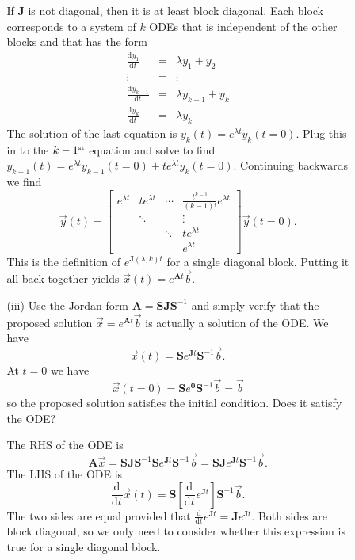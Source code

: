 \documentclass[11pt,fleqn]{article}
\newcommand{\mat}[1]{\mathbf{#1}}
\newcommand{\dd}[3]{\frac{\mathrm{d}^{#3}{#1}}{\mathrm{d}{#2}^{#3}}}
\begin{document}
\begin{enumerate}
\begin{itemize}
\begin{itemize}
     		If {\bf J} is not diagonal, then it is at least block diagonal. Each block corresponds to a system of $k$ ODEs that is independent of the other blocks and that has the form
     		\begin{eqnarray*}
     		\dd{y_1}{t}{} &=& \lambda y_1 + y_2 \\
     		\vdots &=& \vdots\\
     		\dd{y_{k-1}}{t}{} &=& \lambda y_{k-1} + y_k\\
     		\dd{y_k}{t}{} &=& \lambda y_k
     		\end{eqnarray*}
     		The solution of the last equation is $y_k(t) = e^{\lambda t}y_k(t=0)$. Plug this in to the $k-1^{\mbox{\tiny st}}$ equation and solve to find $y_{k-1}(t) = e^{\lambda t}y_{k-1}(t=0) + te^{\lambda t}y_{k}(t=0).$ Continuing backwards we find
     		\[\vec{y}(t) = \left[\begin{array}{cccc}e^{\lambda t}&te^{\lambda t}&\cdots&\frac{t^{k-1}}{(k-1)!}e^{\lambda t}\\&\ddots&&\vdots\\&&\ddots&te^{\lambda t}\\&&&e^{\lambda t}\end{array}\right]\vec{y}(t=0).\]
     		This is the definition of $e^{\mathbf{J}(\lambda,k)t}$ for a single diagonal block. Putting it all back together yields  $\vec{x}(t) = e^{\mathbf{A}t}\vec{b}$.
     		
     		\item[(iii)] Use the Jordan form $\mathbf{A} = \mathbf{SJS}^{-1}$ and simply verify that the proposed solution $\vec{x} = e^{\mathbf{A}t}\vec{b}$ is actually a solution of the ODE. We have
     		\[\vec{x}(t) = \mathbf{S}e^{\mathbf{J}t}\mathbf{S}^{-1}\vec{b}.\]
     		At $t=0$ we have 
     		\[\vec{x}(t=0) = \mathbf{S}e^{\mathbf{0}}\mathbf{S}^{-1}\vec{b} = \vec{b}\]
     		so the proposed solution satisfies the initial condition. Does it satisfy the ODE?
     		
     		The RHS of the ODE is
     		 \[\mathbf{A}\vec{x} = \mathbf{SJS}^{-1}\mathbf{S}e^{\mathbf{J}t}\mathbf{S}^{-1}\vec{b} = \mathbf{SJ}e^{\mathbf{J}t}\mathbf{S}^{-1}\vec{b}.\]
     		 The LHS of the ODE is
     		\[\dd{}{t}{}\vec{x}(t) = \mathbf{S}\left[\dd{}{t}{}e^{\mathbf{J}t}\right]\mathbf{S}^{-1}\vec{b}.\]
     		The two sides are equal provided that $\dd{}{t}{}e^{\mathbf{J}t} = \mathbf{J}e^{\mat{J}t}$.
     		Both sides are block diagonal, so we only need to consider whether this expression is true for a single diagonal block.
     		

\end{itemize}
\end{itemize}
\end{enumerate}
\end{document}
